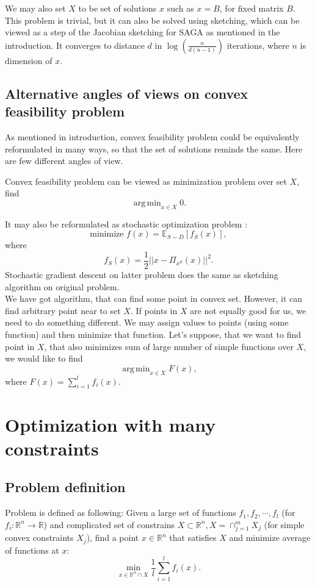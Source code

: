 \documentclass[11pt]{book}
\newcommand{\R}{\mathbb{R}}
\newcommand{\E}{\mathbb{E}}
\DeclareMathOperator*{\argmin}{arg\,min}
\begin{document}
We may also set $X$ to be set of solutions $x$ such as $x=B$, for fixed matrix $B$. This problem is trivial, but it can also be solved using sketching, which can be viewed as a step of the Jacobian sketching for SAGA as mentioned in the introduction. It converges to distance $d$ in $\log(\frac{n}{d(n-1)})$\label{xIsB} iterations, where $n$ is dimension of $x$.\\

\section{Alternative angles of views on convex feasibility problem}
As mentioned in introduction, convex feasibility problem could be equivalently reformulated in many ways, so that the set of solutions reminds the same. Here are few different angles of view.

Convex feasibility problem can be viewed as minimization problem over set $X$, find $$\argmin_{x \in X} 0.$$

It may also be reformulated as stochastic optimization problem \cite{sketchAndProject}: $$\text{minimize } f(x)=\E_{S \sim D}[f_S(x)],$$ where $$f_S(x) = \frac{1}{2}||x-\Pi_{x^S}(x)||^2.$$
Stochastic gradient descent on latter problem does the same as sketching algorithm on original problem.\\

We have got algorithm, that can find some point in convex set. However, it can find arbitrary point near to set $X$. If points in $X$ are not equally good for us, we need to do something different. We may assign values to points (using some function) and then minimize that function. Let's suppose, that we want to find point in $X$, that also minimizes sum of large number of simple functions over $X$, we would like to find $$\argmin_{x \in X} F(x),$$ where $F(x)=\sum_{i=1}^{l}f_i(x).$



\chapter{Optimization with many constraints}

\section{Problem definition}
Problem is defined as following: Given a large set of functions $f_1,f_2,\cdots,f_l$ (for $f_i: \R^n \rightarrow \R$) and complicated set of constrains $X \subset \R^n, X = \cap_{j=1}^m X_j$ (for simple convex constraints $X_j$), find a point $x \in \R^n$ that satisfies $X$ and minimize average of functions at $x$\cite{kosto}: $$ \min_{x \in \R^n \cap X} \frac{1}{l}\sum_{i=1}^l f_i(x).$$
\end{document}
